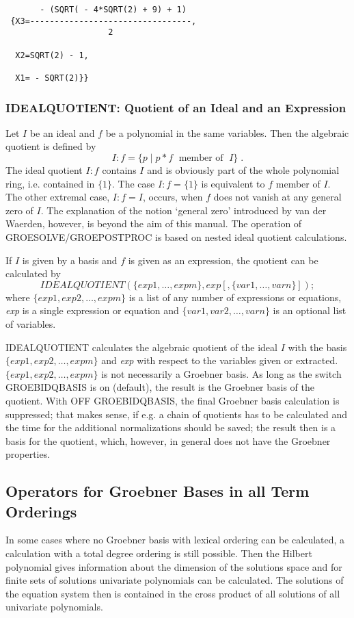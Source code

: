 \newpage  %
\begin{verbatim}
       - (SQRT( - 4*SQRT(2) + 9) + 1)
 {X3=---------------------------------,
                     2

  X2=SQRT(2) - 1,

  X1= - SQRT(2)}}
\end{verbatim}

\subsubsection{IDEALQUOTIENT: Quotient of an Ideal and an Expression}
  
Let $I$ be an ideal and $f$ be a polynomial in the same
variables. Then the algebraic quotient is defined by
\[
I:f = \{ p \;| \; p * f \;\mbox{    member of }\; I\}\;.
\]
The ideal quotient $I:f$ contains $I$ and is obviously part of the
whole polynomial ring, i.e. contained in $\{1\}$. The case $I:f =
\{1\}$ is equivalent to $f$ member of  $I$. The other extremal case,
$I:f=I$, occurs, when $f$ does not vanish at any general zero of $I$.
The explanation of the notion `general zero' introduced by van der
Waerden, however, is beyond the aim of this manual. The operation
of GROESOLVE/GROEPOSTPROC is based on nested ideal quotient
calculations.

If $I$ is given by a basis and $f$ is given as an expression, the
quotient can be calculated by
\[
IDEALQUOTIENT (\{exp1, \ldots , expm\}, exp [,\{var1,
\ldots , varn\}]); \]
where $\{exp1, exp2, \ldots , expm\}$ is a list of any number of
expressions or equations, {\it exp} is a single expression or equation
and $\{var1, var2, \ldots , varn\}$ is an optional list of variables.

IDEALQUOTIENT calculates the algebraic quotient of the ideal $I$
with the basis  $\{exp1, exp2, \ldots , expm\}$ and {\it exp} with
respect to  the variables given or extracted.  $\{exp1, exp2, \ldots ,
expm\}$ is not necessarily a Groebner basis. As long as the switch
GROEBIDQBASIS is on (default), the result is the Groebner basis of
the quotient. With OFF GROEBIDQBASIS, the final Groebner basis
calculation is suppressed; that makes sense, if e.g. a chain of
quotients has to be calculated and the time for the additional
normalizations should be saved; the result then is a basis for the
quotient, which, however, in general does not have the Groebner
properties.

\subsection{Operators for Groebner Bases in all Term Orderings}
In some cases where no Groebner
basis with lexical ordering can be calculated, a calculation with a total
degree ordering is still possible. Then the Hilbert polynomial gives
information about the dimension of the solutions space and for finite
sets of solutions univariate polynomials can be calculated. The solutions
of the equation system then is contained in the cross product of all
solutions of all univariate polynomials.

